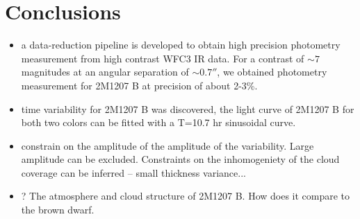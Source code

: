 \documentclass[apj]{emulateapj}
\begin{document}





\section{Conclusions}
\begin{itemize}
\item a data-reduction pipeline is developed to obtain high precision
  photometry measurement from high contrast WFC3 IR data. For a
  contrast of $\sim 7$ magnitudes at an angular separation of
  $\sim0.7''$, we obtained photometry measurement for 2M1207 B at
  precision of about 2-3\%. 
\item time variability for 2M1207 B was discovered, the light curve of
  2M1207 B for both two colors can be fitted with a T=10.7 hr
  sinusoidal curve.
\item constrain on the amplitude of the amplitude of the
  variability. Large amplitude can be excluded. Constraints on the
  inhomogeniety of the cloud coverage can be inferred -- small
  thickness variance...
\item ? The atmosphere and cloud structure of 2M1207 B. How does it
  compare to the brown dwarf.
\end{itemize}



\end{document}
